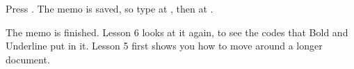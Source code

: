 \begin{WPSteps}
\item Press .  The memo is saved, so type  at
, then  at .
\end{WPSteps}
\EndReplay
The memo is finished.  Lesson 6 looks at it again, to see the codes that
Bold and Underline put in it.  Lesson 5 first shows you how to move around
a longer document.
